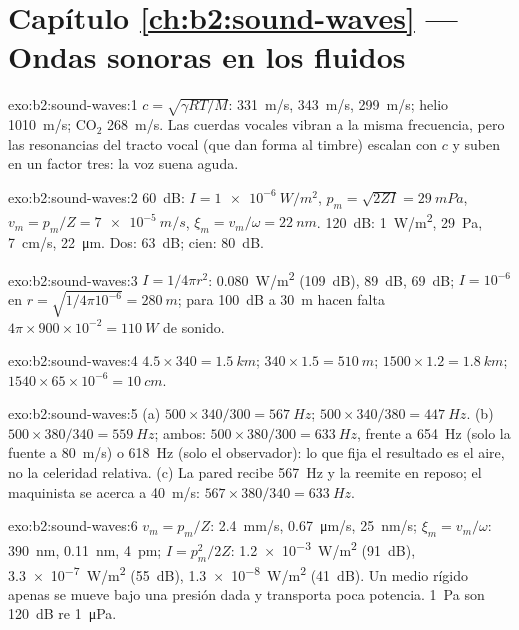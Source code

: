 \section*{Capítulo \ref{ch:b2:sound-waves} --- Ondas sonoras en los fluidos}

\begin{solution}{exo:b2:sound-waves:1}
$c = \sqrt{\gamma RT/M}$: \qty{331}{m/s}, \qty{343}{m/s}, \qty{299}{m/s}; helio
\qty{1010}{m/s}; CO$_2$ \qty{268}{m/s}. Las cuerdas vocales vibran a la misma
frecuencia, pero las resonancias del tracto vocal (que dan forma al
timbre) escalan con $c$ y suben en un factor tres: la voz suena aguda.
\end{solution}

\begin{solution}{exo:b2:sound-waves:2}
\qty{60}{dB}: $I = \qty{1e-6}{W/m^2}$, $p_m = \sqrt{2ZI} = \qty{29}{mPa}$, $v_m = p_m/Z =
\qty{7e-5}{m/s}$, $\xi_m = v_m/\omega = \qty{22}{nm}$. \qty{120}{dB}: \qty{1}{W/m^2},
\qty{29}{Pa}, \qty{7}{cm/s}, \qty{22}{\micro m}. Dos: \qty{63}{dB}; cien: \qty{80}{dB}.
\end{solution}

\begin{solution}{exo:b2:sound-waves:3}
$I = 1/4\pi r^2$: \qty{0.080}{W/m^2} (\qty{109}{dB}), \qty{89}{dB}, \qty{69}{dB}; $I = 10^{-6}$
en $r = \sqrt{1/4\pi10^{-6}} = \qty{280}{m}$; para \qty{100}{dB} a \qty{30}{m} hacen falta $4\pi \times
900 \times 10^{-2} = \qty{110}{W}$ de sonido.
\end{solution}

\begin{solution}{exo:b2:sound-waves:4}
$4.5 \times 340 = \qty{1.5}{km}$; $340 \times 1.5 = \qty{510}{m}$; $1500 \times 1.2 = \qty{1.8}{km}$;
$1540 \times 65 \times 10^{-6} = \qty{10}{cm}$.
\end{solution}

\begin{solution}{exo:b2:sound-waves:5}
(a) $500 \times 340/300 = \qty{567}{Hz}$; $500 \times 340/380 = \qty{447}{Hz}$. (b) $500 \times
380/340 = \qty{559}{Hz}$; ambos: $500 \times 380/300 = \qty{633}{Hz}$, frente a \qty{654}{Hz}
(solo la fuente a \qty{80}{m/s}) o \qty{618}{Hz} (solo el observador): lo que fija
el resultado es el aire, no la celeridad relativa. (c) La pared recibe \qty{567}{Hz}
y la reemite en reposo; el maquinista se acerca a \qty{40}{m/s}: $567 \times
380/340 = \qty{633}{Hz}$.
\end{solution}

\begin{solution}{exo:b2:sound-waves:6}
$v_m = p_m/Z$: \qty{2.4}{mm/s}, \qty{0.67}{\micro m/s}, \qty{25}{nm/s}; $\xi_m = v_m/\omega$:
\qty{390}{nm}, \qty{0.11}{nm}, \qty{4}{pm}; $I = p_m^2/2Z$: \qty{1.2e-3}{W/m^2} (\qty{91}{dB}),
\qty{3.3e-7}{W/m^2} (\qty{55}{dB}), \qty{1.3e-8}{W/m^2} (\qty{41}{dB}). Un medio rígido
apenas se mueve bajo una presión dada y transporta poca potencia.
\qty{1}{Pa} son \qty{120}{dB} re \qty{1}{\micro Pa}.
\end{solution}

